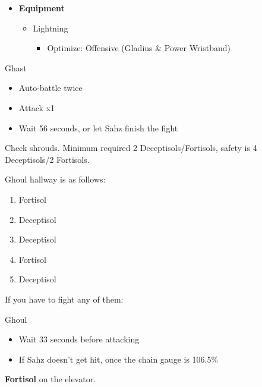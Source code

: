 \documentclass{report}
\begin{document}

\begin{menu}
\begin{itemize}
    \item \textbf{Equipment}
    \begin{itemize}
        \item Lightning
        \begin{itemize}
            \item Optimize: Offensive (Gladius \& Power Wristband)
        \end{itemize}
    \end{itemize}
\end{itemize}
\end{menu}

\begin{battle}{Ghast}
\begin{itemize}
    \item Auto-battle twice
    \item Attack x1
    \item Wait 56 seconds, or let Sahz finish the fight
\end{itemize}
\end{battle}

Check shrouds. Minimum required 2 Deceptisols/Fortisols, safety is 4 Deceptisols/2 Fortisols.

Ghoul hallway is as follows:

\begin{enumerate}
    \item Fortisol
    \item Deceptisol
    \item Deceptisol
    \item Fortisol
    \item Deceptisol
\end{enumerate}

If you have to fight any of them:

\begin{battle}{Ghoul}
\begin{itemize}
    \item Wait 33 seconds before attacking
    \item If Sahz doesn't get hit, once the chain gauge is 106.5\%
\end{itemize}
\end{battle}

\textbf{Fortisol} on the elevator.
\end{document}
